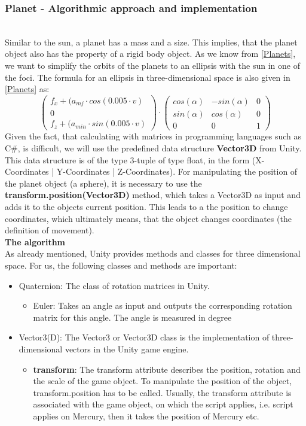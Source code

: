 \documentclass[conference,compsoc]{IEEEtran}
\begin{document}
\subsubsection{Planet - Algorithmic approach and implementation} \hfill\\
Similar to the sun, a planet has a mass and a size. This implies, that the planet object also has the property of a rigid body object. 
As we know from \ref{Planets}, we want to simplify the orbits of the planets to an ellipsis with the sun in one of the foci. The formula for an ellipsis in three-dimensional space is also given in \ref{Planets} as:
$$\begin{pmatrix}
	f_{x} + (a_{mj} \cdot cos(0.005 \cdot v) \\ 0\\
	f_{z} + (a_{min} \cdot sin(0.005 \cdot v)
\end{pmatrix} \cdot \begin{pmatrix}
	cos(\alpha) & -sin(\alpha) & 0 \\
	sin(\alpha) & cos(\alpha) & 0 \\
	0 & 0 & 1
\end{pmatrix} $$
Given the fact, that calculating with matrices in programming languages such as C\#, is difficult, we will use the predefined data structure \textbf{Vector3D} from Unity. This data structure is of the type 3-tuple of type float, in the form (X-Coordinates | Y-Coordinates | Z-Coordinates). For manipulating the position of the planet object (a sphere), it is necessary to use the \textbf{transform.position(Vector3D)} method, which takes a Vector3D as input and adds it to the objects current position. This leads to a the position to change coordinates, which ultimately means, that the object changes coordinates (the definition of movement). \\
\textbf{The algorithm} \\
As already mentioned, Unity provides methods and classes for three dimensional space. For us, the following classes and methods are important:
\begin{itemize}
	\item Quaternion: The class of rotation matrices in Unity. 
	\begin{itemize}
		\item Euler: Takes an angle as input and outputs the corresponding rotation matrix for this angle. The angle is measured in degree
	\end{itemize}
	\item Vector3(D): The Vector3 or Vector3D class is the implementation of three-dimensional vectors in the Unity game engine. 
	\begin{itemize}
		\item \textbf{transform}: The transform attribute describes the position, rotation and the scale of the game object. To manipulate the position of the object, transform.position has to be called. Usually, the transform attribute is associated with the game object, on which the script applies, i.e. script applies on Mercury, then it takes the position of Mercury etc. 
	\end{itemize}
\end{itemize}
\end{document}

